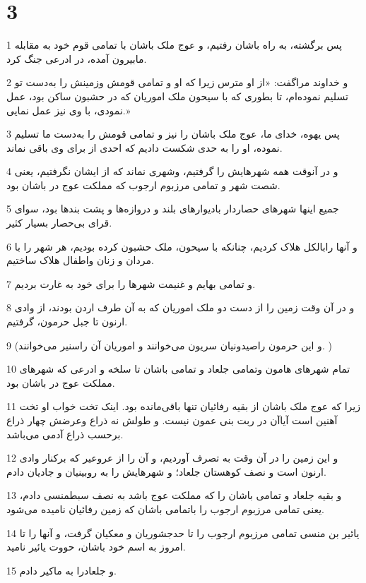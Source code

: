 \chapter{3}

\par 1 پس برگشته، به راه باشان رفتیم، و عوج ملک باشان با تمامی قوم خود به مقابله مابیرون آمده، در ادرعی جنگ کرد.
\par 2 و خداوند مراگفت: «از او مترس زیرا که او و تمامی قومش وزمینش را به‌دست تو تسلیم نموده‌ام، تا بطوری که با سیحون ملک اموریان که در حشبون ساکن بود، عمل نمودی، با وی نیز عمل نمایی.»
\par 3 پس یهوه، خدای ما، عوج ملک باشان را نیز و تمامی قومش را به‌دست ما تسلیم نموده، او را به حدی شکست دادیم که احدی از برای وی باقی نماند.
\par 4 و در آنوقت همه شهرهایش را گرفتیم، وشهری نماند که از ایشان نگرفتیم، یعنی شصت شهر و تمامی مرزبوم ارجوب که مملکت عوج در باشان بود.
\par 5 جمیع اینها شهرهای حصاردار بادیوارهای بلند و دروازه‌ها و پشت بندها بود، سوای قرای بی‌حصار بسیار کثیر.
\par 6 و آنها رابالکل هلاک کردیم، چنانکه با سیحون، ملک حشبون کرده بودیم، هر شهر را با مردان و زنان واطفال هلاک ساختیم.
\par 7 و تمامی بهایم و غنیمت شهرها را برای خود به غارت بردیم.
\par 8 و در آن وقت زمین را از دست دو ملک اموریان که به آن طرف اردن بودند، از وادی ارنون تا جبل حرمون، گرفتیم.
\par 9 (و این حرمون راصیدونیان سریون می‌خوانند و اموریان آن راسنیر می‌خوانند. )
\par 10 تمام شهرهای هامون وتمامی جلعاد و تمامی باشان تا سلخه و ادرعی که شهرهای مملکت عوج در باشان بود.
\par 11 زیرا که عوج ملک باشان از بقیه رفائیان تنها باقی‌مانده بود. اینک تخت خواب او تخت آهنین است آیاآن در ربت بنی عمون نیست. و طولش نه ذراع وعرضش چهار ذراع برحسب ذراع آدمی می‌باشد.
\par 12 و این زمین را در آن وقت به تصرف آوردیم، و آن را از عروعیر که برکنار وادی ارنون است و نصف کوهستان جلعاد؛ و شهرهایش را به روبینیان و جادیان دادم.
\par 13 و بقیه جلعاد و تمامی باشان را که مملکت عوج باشد به نصف سبطمنسی دادم، یعنی تمامی مرزبوم ارجوب را باتمامی باشان که زمین رفائیان نامیده می‌شود.
\par 14 یائیر بن منسی تمامی مرزبوم ارجوب را تا حدجشوریان و معکیان گرفت، و آنها را تا امروز به اسم خود باشان، حووت یائیر نامید.
\par 15 و جلعادرا به ماکیر دادم.
